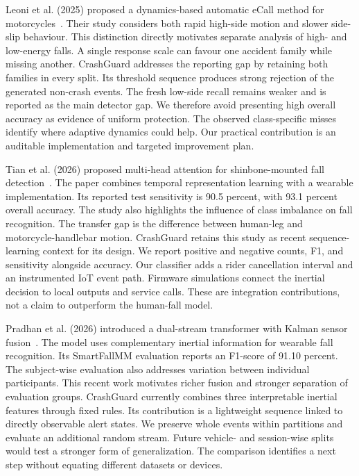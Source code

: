 \documentclass[10pt,a4paper]{article}
\begin{document}
Leoni et al. (2025) proposed a dynamics-based automatic eCall method for motorcycles~\cite{ecall2025}. Their study considers both rapid high-side motion and slower side-slip behaviour. This distinction directly motivates separate analysis of high- and low-energy falls. A single response scale can favour one accident family while missing another. CrashGuard addresses the reporting gap by retaining both families in every split. Its threshold sequence produces strong rejection of the generated non-crash events. The fresh low-side recall remains weaker and is reported as the main detector gap. We therefore avoid presenting high overall accuracy as evidence of uniform protection. The observed class-specific misses identify where adaptive dynamics could help. Our practical contribution is an auditable implementation and targeted improvement plan.


Tian et al. (2026) proposed multi-head attention for shinbone-mounted fall detection~\cite{tian2026transformer}. The paper combines temporal representation learning with a wearable implementation. Its reported test sensitivity is 90.5 percent, with 93.1 percent overall accuracy. The study also highlights the influence of class imbalance on fall recognition. The transfer gap is the difference between human-leg and motorcycle-handlebar motion. CrashGuard retains this study as recent sequence-learning context for its design. We report positive and negative counts, F1, and sensitivity alongside accuracy. Our classifier adds a rider cancellation interval and an instrumented IoT event path. Firmware simulations connect the inertial decision to local outputs and service calls. These are integration contributions, not a claim to outperform the human-fall model.


Pradhan et al. (2026) introduced a dual-stream transformer with Kalman sensor fusion~\cite{dual2026}. The model uses complementary inertial information for wearable fall recognition. Its SmartFallMM evaluation reports an F1-score of 91.10 percent. The subject-wise evaluation also addresses variation between individual participants. This recent work motivates richer fusion and stronger separation of evaluation groups. CrashGuard currently combines three interpretable inertial features through fixed rules. Its contribution is a lightweight sequence linked to directly observable alert states. We preserve whole events within partitions and evaluate an additional random stream. Future vehicle- and session-wise splits would test a stronger form of generalization. The comparison identifies a next step without equating different datasets or devices.
\end{document}
